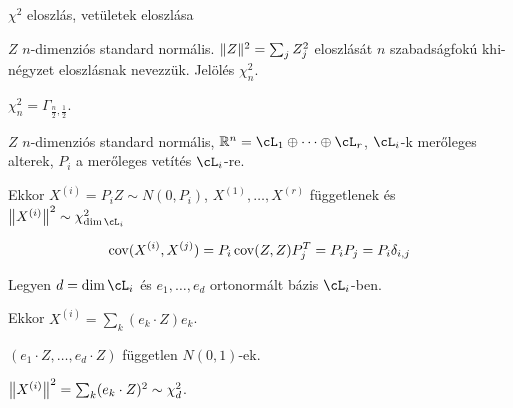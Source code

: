 \documentclass[aspectratio=169,notheorems,9pt,\option]{beamer}
\begin{document}
\begin{frame}{$\chi^2$ eloszlás, vetületek eloszlása}
  \begin{df}
    $Z$ $n$-dimenziós standard normális. $\norm{Z}^2=\sum_jZ_j^2$
    eloszlását $n$ szabadságfokú khi-négyzet eloszlásnak
    nevezzük. Jelölés $\chi^2_n$.
  \end{df}
   $\chi^2_n=\Gamma_{\frac n2,\frac12}$.
   \begin{proposition}
     $Z$ $n$-dimenziós standard normális,
     $\real^n=\cL_1\oplus\cdots\oplus\cL_r$, $\cL_i$-k merőleges
     alterek, $P_i$ a merőleges vetítés $\cL_i$-re.

     Ekkor $X^{(i)}=P_iZ\sim N (0,P_i)$, $X^{(1)},\dots,X^{(r)}$
     függetlenek és $\norm*{X^{(i)}}^2\sim\chi^2_{\dim\cL_i}$
   \end{proposition}
   \continue
   \begin{displaymath}
     \cov (X^{(i)},X^{(j)})=P_i\cov (Z,Z)P_j^T=P_iP_j=P_i\delta_{i,j}
   \end{displaymath}

   Legyen $d=\dim\cL_i$ és $e_1,\dots,e_d$ ortonormált bázis
   $\cL_i$-ben.

   Ekkor $X^{(i)}=\sum_k (e_k\cdot Z)e_k$.

   $(e_1\cdot Z,\dots,e_d\cdot Z)$  független $N (0,1)$-ek.

   $\norm*{X^{(i)}}^2=\sum_k (e_k\cdot Z)^2\sim\chi^2_{d}$.
  
\end{frame}
\end{document}
